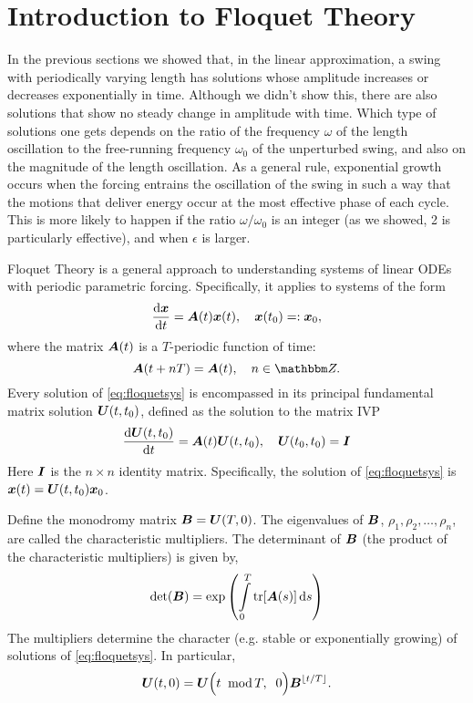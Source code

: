 

\section{Introduction to Floquet Theory}
In the previous sections we showed that, in the linear approximation, a
swing with periodically varying length has solutions whose amplitude
increases or decreases exponentially in time. Although we didn’t show
this, there are also solutions that show no steady change in amplitude
with time. Which type of solutions one gets depends on the ratio of
the frequency $\omega$ of the length oscillation to the free-running
frequency $\omega_0$ of the unperturbed swing, and also on the magnitude  of the
length oscillation. As a general rule, exponential growth occurs when
the forcing entrains the oscillation of the swing in such a way that
the motions that deliver energy occur at the most effective phase of
each cycle. This is more likely to happen if the ratio $\omega/\omega_0$ is an integer
(as we showed, 2 is particularly effective), and when $\epsilon$ is larger.  

Floquet Theory is a general approach to understanding systems of
linear ODEs with periodic parametric forcing. Specifically, it applies
to systems of the form 
\begin{equation}\label{eq:floquetsys}
\dv{\vb{x}}{t}=\vb{A}(t)\vb{x}(t)
\qcomma \vb{x}(t_0)=:\vb{x}_0,
\end{equation}
where the matrix $\vb{A}(t)$ is a $T$-periodic function of time: 
\begin{equation}\label{eq:2}
\vb{A}(t+nT)=\vb{A}(t)\qcomma
n\in\Z.
\end{equation}
Every solution of \eqref{eq:floquetsys} is encompassed in its principal
fundamental matrix solution $\vb{U}(t,t_0)$, defined as the solution
to the matrix IVP  
\begin{equation}
\dv{\vb{U}(t,t_0)}{t}=\vb{A}(t)\vb{U}(t,t_0)\qcomma
\vb{U}(t_0,t_0)=\I
\end{equation}
Here $\I$ is the $n\times n$ identity matrix. Specifically, the
solution of \eqref{eq:floquetsys} is 
$\vb{x}(t)=\vb{U}(t,t_0)\vb{x}_0$.

\bigskip
\noindent
Define the monodromy matrix $\vb{B}=\vb{U}(T, 0)$. 
The eigenvalues of $\vb{B}$, $\rho_{1},\rho_{2},{\dots},\rho_{n}$, are called the characteristic
multipliers. The determinant of $\vb{B}$ (the product of the
characteristic multipliers) is given by, 
\begin{equation}
\det(\vb{B})=\exp \left(
\int_{0}^{T}{\tr[\vb{A}(s)]\id{s}}
\right)
\end{equation}
The multipliers determine the character (e.g. stable or exponentially
growing) of solutions of \eqref{eq:floquetsys}. In particular, 
\begin{equation}
\vb{U}(t, 0)=
\vb{U}\Big(t\;\;\text{mod}\, T,\;\;0\Big)
{\vb{B}}^{\lfloor t/T\rfloor}.
\end{equation}

